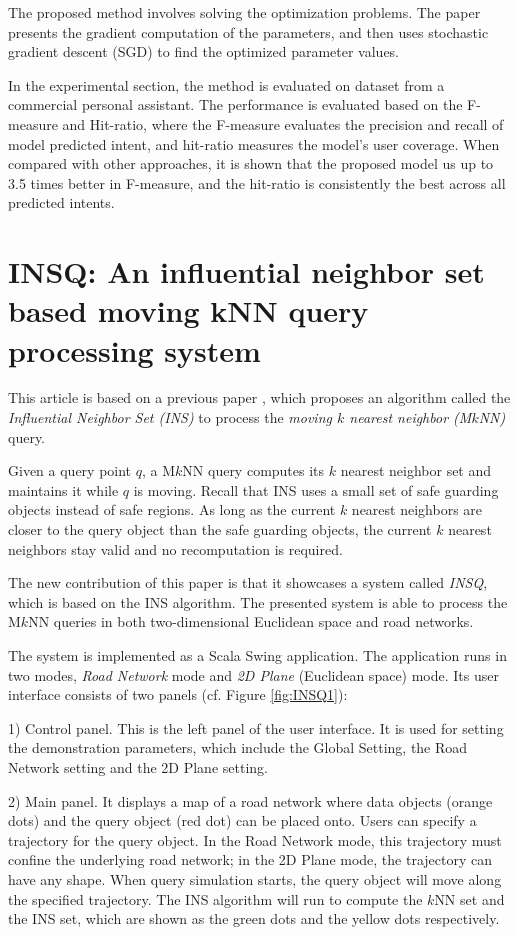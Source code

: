 \documentclass[paper=a4, fontsize=18pt]{article} %
\numberwithin{equation}{section} %
\numberwithin{figure}{section} %
\numberwithin{table}{section} %
\begin{document}
The proposed method involves solving the optimization problems. The paper presents the gradient computation of the parameters, and then uses stochastic gradient descent (SGD) to find the optimized parameter values.

In the experimental section, the method is evaluated on dataset from a commercial personal assistant. The performance is evaluated based on the F-measure and Hit-ratio, where the F-measure evaluates the precision and recall of model predicted intent, and hit-ratio measures the model's user coverage. When compared with other approaches, it is shown that the proposed model us up to 3.5 times better in F-measure, and the hit-ratio is consistently the best across all predicted intents.


\section{{INSQ:} An influential neighbor set based moving kNN query processing system \cite{Li0QYZD16}}

This article is based on a previous paper \cite{Li0QYZ014}, which proposes an algorithm called the \emph{Influential Neighbor Set (INS)} to process the \emph{moving $k$ nearest neighbor (M$k$NN)} query.

Given a query point $q$, a M$k$NN query computes its $k$ nearest neighbor set and maintains it while $q$ is moving. Recall that INS uses a small set of safe guarding objects instead of safe regions. As long as the current $k$ nearest neighbors are closer to the query object than the safe guarding objects, the current $k$ nearest neighbors stay valid and no recomputation is required.

The new contribution of this paper is that it showcases a system called \emph{INSQ}, which is based on the INS algorithm. The presented system is able to process the M$k$NN queries in both two-dimensional Euclidean space and road networks.

The system is implemented as a Scala Swing application. The application runs in two modes, \emph{Road Network} mode and \emph{2D Plane} (Euclidean space) mode. Its user interface consists of two panels (cf. Figure \ref{fig:INSQ1}):

1) Control panel. This is the left panel of the user interface. It is used for setting the demonstration parameters, which include the Global Setting, the Road Network setting and the 2D Plane setting.

2) Main panel. It displays a map of a road network where data objects (orange dots) and the query object (red dot) can be placed onto. Users can specify a trajectory for the query object. In the Road Network mode, this trajectory must confine the underlying road network; in the 2D Plane mode, the trajectory can have any shape. When query simulation starts, the query object will move along the specified trajectory. The INS algorithm will run to compute the $k$NN set and the INS set, which are shown as the green dots and the yellow dots respectively.
\end{document}

